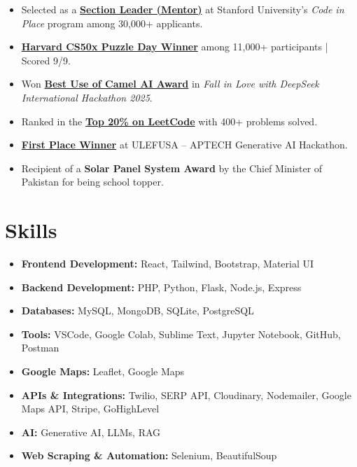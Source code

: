 \documentclass[a4paper,12pt]{article}
\begin{document}
\begin{itemize}[leftmargin=*]
    \item Selected as a \href{https://digitalcredential.stanford.edu/check/FA458483850B4B635DD0915130CCBEBF00F195AFCBF6991EE7448725533BAAB2LzFqZHI1YU9SSmVRZFpMQjVXV0xjdkxuWktYOExkU2RBZE85SFF6YmlPZGZLZDA0}{\textbf{Section Leader (Mentor)}} at Stanford University’s \textit{Code in Place} program among 30,000+ applicants.
    \item \href{https://www.linkedin.com/posts/muhammad-qasim-gill_cs50-harvard-puzzleday2025-activity-7316559580790972418-4B6G?utm_source=share&utm_medium=member_desktop&rcm=ACoAACG6gOwBnlfoWP0KSUXYMZV0hE4WXwmWsBQ}{\textbf{Harvard CS50x Puzzle Day Winner}} among 11,000+ participants | Scored 9/9.
    \item Won \href{https://lablab.ai/event/fall-in-love-with-deepseek/shallowseekers/ai-powered-personal-finance-assistant}{\textbf{Best Use of Camel AI Award}} in \textit{Fall in Love with DeepSeek International Hackathon 2025}.
    \item Ranked in the \href{https://leetcode.com/u/MuhammadQasim007/}{\textbf{Top 20\% on LeetCode}} with 400+ problems solved.
    \item \href{https://www.linkedin.com/posts/muhammad-qasim-gill_celebrating-the-top-10-hackathon-winners-activity-7304649229472309248--oea?utm_source=share&utm_medium=member_desktop&rcm=ACoAACG6gOwBnlfoWP0KSUXYMZV0hE4WXwmWsBQ}{\textbf{First Place Winner}} at ULEFUSA – APTECH Generative AI Hackathon.
    \item Recipient of a \textbf{Solar Panel System Award} by the Chief Minister of Pakistan for being school topper.
\end{itemize}


\section{Skills}

\begin{itemize}[leftmargin=*]
    \item \textbf{Frontend Development:} React, Tailwind, Bootstrap, Material UI
    \item \textbf{Backend Development:} PHP, Python, Flask, Node.js, Express
    \item \textbf{Databases:} MySQL, MongoDB, SQLite, PostgreSQL
    \item \textbf{Tools:} VSCode, Google Colab, Sublime Text, Jupyter Notebook, GitHub, Postman
    \item \textbf{Google Maps:} Leaflet, Google Maps
    \item \textbf{APIs \& Integrations:} Twilio, SERP API, Cloudinary, Nodemailer, Google Maps API, Stripe, GoHighLevel
    \item \textbf{AI:} Generative AI, LLMs, RAG
    \item \textbf{Web Scraping \& Automation:} Selenium, BeautifulSoup
\end{itemize}
\end{document}
